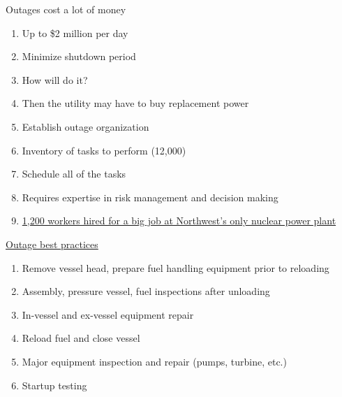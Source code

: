 \documentclass[aspectratio=1610,pdftex,dvipsnames,compress,xcolor={dvipsnames}]{beamer}
\newcommand{\acsp}{\acrshortpl} %
\begin{document}
\begin{frame}{Outages cost a lot of money}
    \begin{enumerate}[series=outerlist,topsep=0pt,itemsep=11pt,leftmargin=*,label=(\arabic*)]
        \item[]Up to \$2 million per day
        \item[]Minimize shutdown period
        \item[]How will \acsp{smr} do it?
        \item[]Then the utility may have to buy replacement power
        \item[]Establish outage organization
        \item[]Inventory of tasks to perform (12,000)
        \item[]Schedule all of the tasks
        \item[]Requires expertise in risk management and decision making
        \item[]\href{https://currently.att.yahoo.com/att/1-200-workers-hired-big-120000470.html}{1,200 workers hired for a big job at Northwest's only nuclear power plant}
    \end{enumerate}
\end{frame}


\begin{frame}{\href{http://www.iaea.org/inis/collection/NCLCollectionStore/_Public/23/014/23014979.pdf}{Outage best practices}}
    \begin{enumerate}[series=outerlist,topsep=0pt,itemsep=11pt,leftmargin=*,label=(\arabic*)]
        \item[]Remove vessel head, prepare fuel handling equipment prior to reloading
        \item[]Assembly, pressure vessel, fuel inspections after unloading
        \item[]In-vessel and ex-vessel equipment repair
        \item[]Reload fuel and close vessel
        \item[]Major equipment inspection and repair (pumps, turbine, etc.)
        \item[]Startup testing
    \end{enumerate}
\end{frame}
\end{document}
